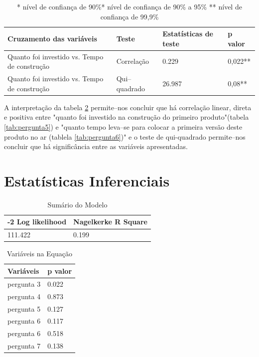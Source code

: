 \begin{table}[hb]
\centering
\caption{Testes de correla\c{c}\~ao e qui--quadrado}
\label{tab:cruza1}
\begin{tabular}{|p{5cm}|p{3cm}|p{3cm}|p{2cm}|}
\hline{\bf Cruzamento das vari\'aveis} & {\bf Teste} & {\bf Estat\'isticas de teste} & {\bf p valor}\\
\hline Quanto foi investido vs. Tempo de constru\c{c}\~ao & Correla\c{c}\~ao & 0.229 & 0,022**\\
\hline Quanto foi investido vs. Tempo de constru\c{c}\~ao & Qui--quadrado & 26.987 & 0,08**\\
\hline
\end{tabular}
\captionsetup{justification=raggedright, singlelinecheck=false}
\caption*{* n\'ivel de confian\c{c}a de 90\%\linebreak ** n\'ivel de confian\c{c}a de 90\% a 95\% \linebreak *** n\'ivel de confian\c{c}a de 99,9\%}
\end{table}

A interpreta\c{c}\~ao da tabela \ref{tab:cap4inf1} permite--nos concluir que h\'a correla\c{c}\~ao linear, direta e positiva entre "quanto foi investido na constru\c{c}\~ao do primeiro produto"(tabela \ref{tab:pergunta5}) e "quanto tempo leva--se para colocar a primeira vers\~ao deste produto no ar (tablela \ref{tab:pergunta6})" e o teste de qui-quadrado permite--nos concluir que h\'a signific\^ancia entre as vari\'aveis apresentadas.

\section{Estat\'isticas Inferenciais}

\begin{table}[hb]
\centering
\caption{Sum\'ario do Modelo}
\label{tab:cap4inf1}
\begin{tabular}{|p{5cm}|p{5cm}|}
\hline{\bf -2 Log likelihood} & {\bf Nagelkerke R Square}\\
\hline 111.422 & 0.199\\
\hline
\end{tabular}
\end{table}

\begin{table}[hb]
\centering
\caption{Vari\'aveis na Equa\c{c}\~ao}
\label{tab:inferencial2}
\begin{tabular}{|p{5cm}|p{3cm}|}
\hline{\bf Vari\'aveis} & {\bf p valor}\\
\hline pergunta 3 & 0.022\\
\hline pergunta 4 & 0.873\\
\hline pergunta 5 & 0.127\\
\hline pergunta 6 & 0.117\\
\hline pergunta 6 & 0.518\\
\hline pergunta 7 & 0.138\\
\hline
\end{tabular}
\end{table}